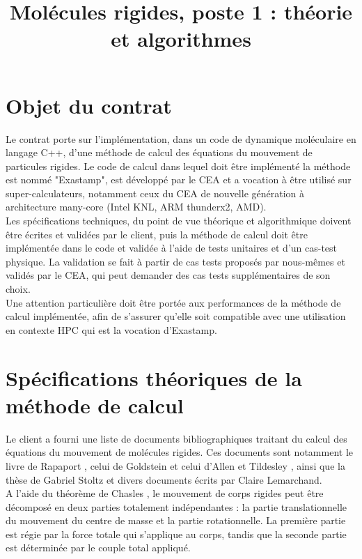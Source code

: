 \documentclass[12pt]{article}
\title{Molécules rigides, poste 1 : théorie et algorithmes}
\begin{document}
  \maketitle

  \section{Objet du contrat}


Le contrat porte sur l’implémentation, dans un code de dynamique moléculaire en langage C++, d’une méthode de calcul des équations du mouvement de particules rigides. Le code de calcul dans lequel doit être implémenté la méthode est nommé "Exastamp", est développé par le CEA et a vocation à être utilisé sur super-calculateurs, notamment ceux du CEA de nouvelle génération à architecture many-core (Intel KNL, ARM thunderx2, AMD). \\
Les spécifications techniques, du point de vue théorique et algorithmique doivent être écrites et validées par le client, puis la méthode de calcul doit être implémentée dans le code et validée à l’aide de tests unitaires et d’un cas-test physique. La validation se fait à partir de cas tests proposés par nous-mêmes et validés par le CEA, qui peut demander des cas tests supplémentaires de son choix. \\
Une attention particulière doit être portée aux performances de la méthode de calcul implémentée, afin de s’assurer qu’elle soit compatible avec une utilisation en contexte HPC qui est la vocation d’Exastamp. \\

  \section{Spécifications théoriques de la méthode de calcul }

Le client a fourni une liste de documents bibliographiques traitant du calcul des équations du mouvement de molécules rigides. Ces documents sont notamment le livre de Rapaport \cite{rapaport}, celui de Goldstein \cite{goldstein} et celui d'Allen et Tildesley \cite{allentildesley}, ainsi que la thèse de Gabriel Stoltz \cite{stoltz} et divers documents écrits par Claire Lemarchand. \\

A l'aide du théorème de Chasles \cite{goldstein}, le mouvement de corps rigides peut être décomposé en deux parties totalement indépendantes : la partie translationnelle du mouvement du centre de masse et la partie rotationnelle. La première partie est régie par la force totale qui s'applique au corps, tandis que la seconde partie est déterminée par le couple total appliqué. 
\end{document}
